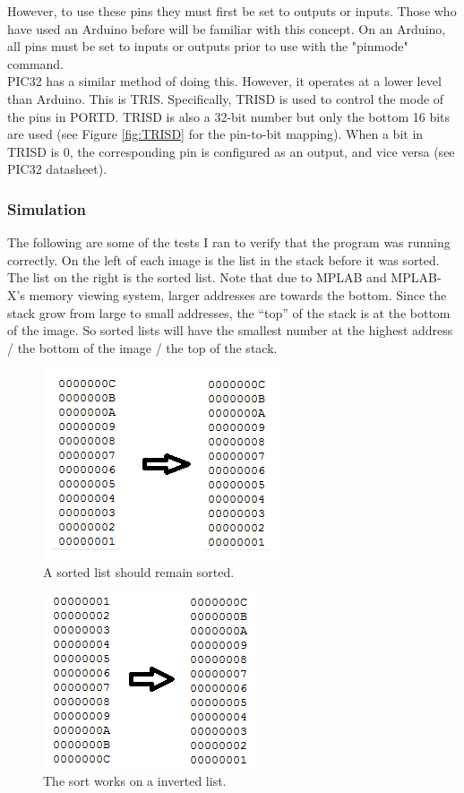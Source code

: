 \documentclass[11pt]{article}
\begin{document}
However, to use these pins they must first be set to outputs or inputs. Those who have used an Arduino before will be familiar with this concept. On an Arduino, all pins must be set to inputs or outputs prior to use with the "pinmode" command. \\

PIC32 has a similar method of doing this. However, it operates at a lower level than Arduino. This is TRIS. Specifically, TRISD is used to control the mode of the pins in PORTD. TRISD is also a 32-bit number but only the bottom 16 bits are used (see Figure \ref{fig:TRISD} for the pin-to-bit mapping). When a bit in TRISD is 0, the corresponding pin is configured as an output, and vice versa (see PIC32 datasheet). 
 


\clearpage


\subsubsection{Simulation}

The following are some of the tests I ran to verify that the program was running correctly. On the left of each image is the list in the stack before it was sorted. The list on the right is the sorted list. Note that due to MPLAB and MPLAB-X's memory viewing system, larger addresses are towards the bottom. Since the stack grow from large to small addresses, the \enquote{top} of the stack is at the bottom of the image. So sorted lists will have the smallest number at the highest address / the bottom of the image / the top of the stack.

\begin{figure}[h!]
\centering
\includegraphics[scale=0.9]{sort1.png}
\caption{A sorted list should remain sorted.}
\label{fig:sort1}
\end{figure} 

\begin{figure}[h!]
\centering
\includegraphics[scale=0.9]{sort2.png}
\caption{The sort works on a inverted list.}
\label{fig:sort2}
\end{figure} 
\end{document}
